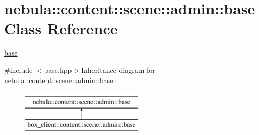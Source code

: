 \hypertarget{classnebula_1_1content_1_1scene_1_1admin_1_1base}{
\section{nebula::content::scene::admin::base Class Reference}
\label{classnebula_1_1content_1_1scene_1_1admin_1_1base}
}


\hyperlink{classnebula_1_1content_1_1scene_1_1admin_1_1base}{base}  


{\ttfamily \#include $<$base.hpp$>$}Inheritance diagram for nebula::content::scene::admin::base::\begin{figure}[H]
\begin{center}
\leavevmode
\includegraphics[height=2cm]{classnebula_1_1content_1_1scene_1_1admin_1_1base}
\end{center}
\end{figure}
